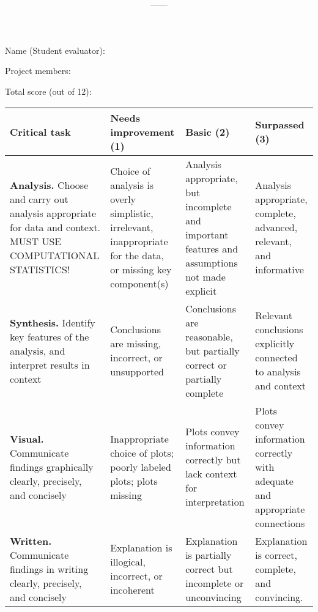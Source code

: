 \documentclass[11pt,onecolumn]{article}
\title{\textbf{\coursename}}
\author{{\semester}---{\roomnumb}---{\classtimes}}
\date{}
\makeatletter
\newcommand{\myname}{A.~Grant Schissler}
\newcommand{\myemail}{aschissler@unr.edu}
\newcommand{\office}{DMSC 224}
\newcommand{\officehours}{Tue 2:30pm-3:30pm, Wed 1:30pm-2:30pm, or by appointment}
\makeatother
\begin{document}



Name (Student evaluator): 

Project members: 

Total score (out of 12): 

\begin{table}[htb]
  \centering
  \begin{tabular}{|p{4.5cm}|p{4.2cm}|p{3.75cm}|p{3.5cm}|}
    \hline
    \bf Critical task & \bf Needs improvement (1) & \bf Basic (2) & \bf Surpassed (3) \\
    \hline
    \hline
    \textbf{Analysis.} Choose and carry out analysis appropriate for data and context. MUST USE COMPUTATIONAL STATISTICS! & Choice of analysis is overly simplistic, irrelevant, inappropriate for the data, or missing key component(s)& Analysis appropriate, but incomplete and important features and assumptions not made explicit & Analysis appropriate, complete, advanced, relevant, and informative\\
    \hline
    \textbf{Synthesis.} Identify key features of the analysis, and interpret results in context & Conclusions are missing, incorrect, or unsupported & Conclusions are reasonable, but partially correct or partially complete & Relevant conclusions explicitly connected to analysis and context\\
    \hline
    \textbf{Visual.} Communicate findings graphically clearly, precisely, and concisely & Inappropriate choice of plots; poorly labeled plots; plots missing & Plots convey information correctly but lack context for interpretation & Plots convey information correctly with adequate and appropriate connections\\
    \hline
    \textbf{Written.} Communicate findings in writing clearly, precisely, and concisely & Explanation is illogical, incorrect, or incoherent & Explanation is partially correct but incomplete or unconvincing & Explanation is correct, complete, and convincing.\\
    \hline
  \end{tabular}
\end{table}
\end{document}
